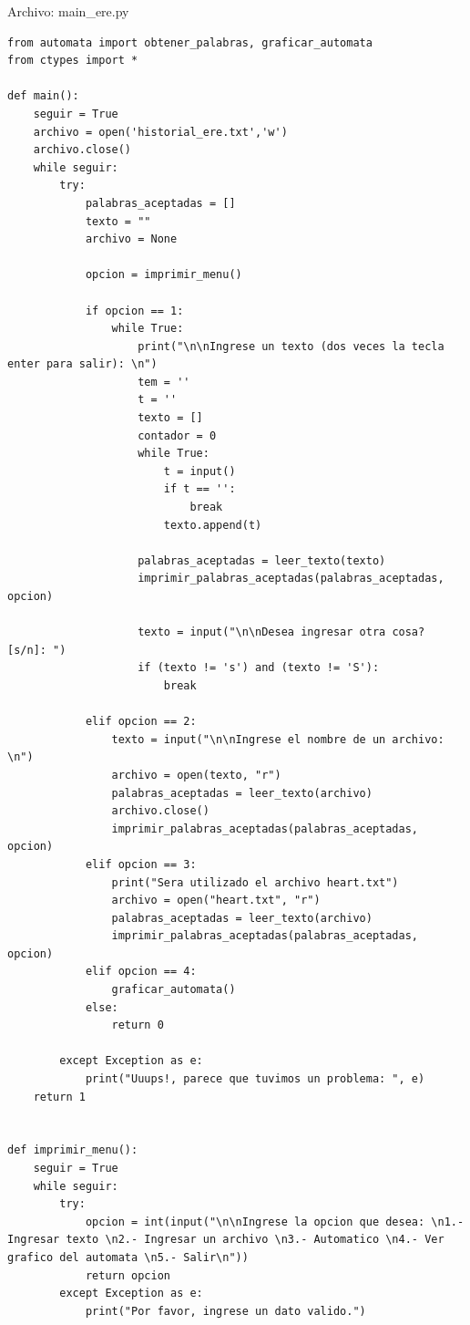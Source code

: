 \documentclass[12pt]{article}
\begin{document}
Archivo: main\_ere.py
\lstset{language=Python, breaklines=true, basicstyle=\footnotesize}
\begin{lstlisting}[frame=single]
from automata import obtener_palabras, graficar_automata
from ctypes import *

def main():
    seguir = True
    archivo = open('historial_ere.txt','w')
    archivo.close()
    while seguir:
        try:
            palabras_aceptadas = []
            texto = ""
            archivo = None

            opcion = imprimir_menu()

            if opcion == 1:
                while True:
                    print("\n\nIngrese un texto (dos veces la tecla enter para salir): \n")
                    tem = ''
                    t = ''
                    texto = []
                    contador = 0
                    while True:
                        t = input()
                        if t == '':
                            break
                        texto.append(t)

                    palabras_aceptadas = leer_texto(texto)
                    imprimir_palabras_aceptadas(palabras_aceptadas, opcion)

                    texto = input("\n\nDesea ingresar otra cosa? [s/n]: ")
                    if (texto != 's') and (texto != 'S'):
                        break

            elif opcion == 2:
                texto = input("\n\nIngrese el nombre de un archivo: \n")
                archivo = open(texto, "r")
                palabras_aceptadas = leer_texto(archivo)
                archivo.close()
                imprimir_palabras_aceptadas(palabras_aceptadas, opcion)
            elif opcion == 3:
                print("Sera utilizado el archivo heart.txt")
                archivo = open("heart.txt", "r")
                palabras_aceptadas = leer_texto(archivo)
                imprimir_palabras_aceptadas(palabras_aceptadas, opcion)
            elif opcion == 4:
                graficar_automata()
            else:
                return 0

        except Exception as e:
            print("Uuups!, parece que tuvimos un problema: ", e)
    return 1


def imprimir_menu():
    seguir = True
    while seguir:
        try:
            opcion = int(input("\n\nIngrese la opcion que desea: \n1.- Ingresar texto \n2.- Ingresar un archivo \n3.- Automatico \n4.- Ver grafico del automata \n5.- Salir\n"))
            return opcion
        except Exception as e:
            print("Por favor, ingrese un dato valido.")



\end{lstlisting}
\end{document}
